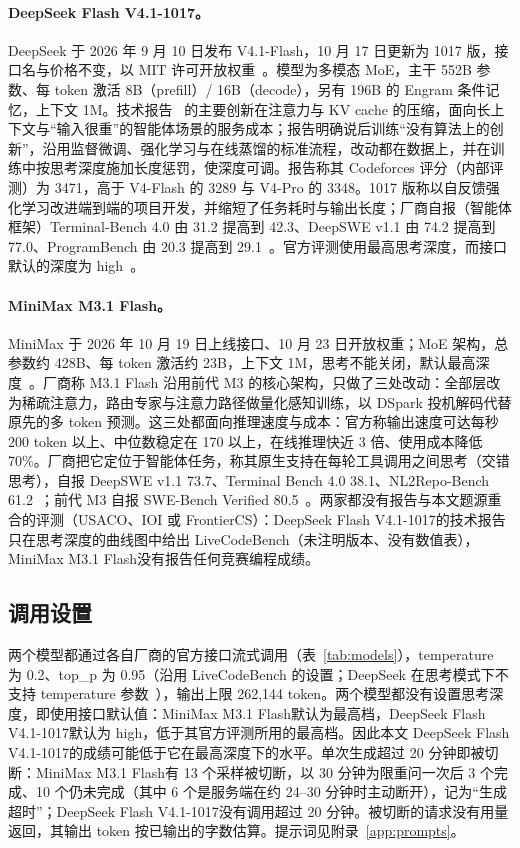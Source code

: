 \documentclass[11pt,a4paper,fontset=none]{ctexart}
\newcommand{\ds}{DeepSeek Flash V4.1-1017}
\newcommand{\mini}{MiniMax M3.1 Flash}
\begin{document}
\paragraph{\ds。}DeepSeek 于 2026 年 9 月 10 日发布 V4.1-Flash，10 月 17 日更新为 1017 版，接口名与价格不变，以 MIT 许可开放权重~\cite{ds1017}。模型为多模态 MoE，主干 552B 参数、每 token 激活 8B（prefill）/ 16B（decode），另有 196B 的 Engram 条件记忆，上下文 1M。技术报告~\cite{dsv41} 的主要创新在注意力与 KV cache 的压缩，面向长上下文与“输入很重”的智能体场景的服务成本；报告明确说后训练“没有算法上的创新”，沿用监督微调、强化学习与在线蒸馏的标准流程，改动都在数据上，并在训练中按思考深度施加长度惩罚，使深度可调。报告称其 Codeforces 评分（内部评测）为 3471，高于 V4-Flash 的 3289 与 V4-Pro 的 3348。1017 版称以自反馈强化学习改进端到端的项目开发，并缩短了任务耗时与输出长度；厂商自报（智能体框架）Terminal-Bench 4.0 由 31.2 提高到 42.3、DeepSWE v1.1 由 74.2 提高到 77.0、ProgramBench 由 20.3 提高到 29.1~\cite{ds1017}。官方评测使用最高思考深度，而接口默认的深度为 high~\cite{dsapi}。

\paragraph{\mini。}MiniMax 于 2026 年 10 月 19 日上线接口、10 月 23 日开放权重；MoE 架构，总参数约 428B、每 token 激活约 23B，上下文 1M，思考不能关闭，默认最高深度~\cite{minimaxm31}。厂商称 M3.1 Flash 沿用前代 M3 的核心架构，只做了三处改动：全部层改为稀疏注意力，路由专家与注意力路径做量化感知训练，以 DSpark 投机解码代替原先的多 token 预测。这三处都面向推理速度与成本：官方称输出速度可达每秒 200 token 以上、中位数稳定在 170 以上，在线推理快近 3 倍、使用成本降低 70\%。厂商把它定位于智能体任务，称其原生支持在每轮工具调用之间思考（交错思考），自报 DeepSWE v1.1 73.7、Terminal Bench 4.0 38.1、NL2Repo-Bench 61.2~\cite{minimaxm31}；前代 M3 自报 SWE-Bench Verified 80.5~\cite{minimaxm3}。两家都没有报告与本文题源重合的评测（USACO、IOI 或 FrontierCS）：\ds 的技术报告只在思考深度的曲线图中给出 LiveCodeBench（未注明版本、没有数值表），\mini 没有报告任何竞赛编程成绩。

\subsection{调用设置}

两个模型都通过各自厂商的官方接口流式调用（表~\ref{tab:models}），temperature 为 0.2、top\_p 为 0.95（沿用 LiveCodeBench 的设置；DeepSeek 在思考模式下不支持 temperature 参数~\cite{dsapi}），输出上限 262,144 token。两个模型都没有设置思考深度，即使用接口默认值：\mini 默认为最高档，\ds 默认为 high，低于其官方评测所用的最高档。因此本文 \ds 的成绩可能低于它在最高深度下的水平。单次生成超过 20 分钟即被切断：\mini 有 13 个采样被切断，以 30 分钟为限重问一次后 3 个完成、10 个仍未完成（其中 6 个是服务端在约 24--30 分钟时主动断开），记为“生成超时”；\ds 没有调用超过 20 分钟。被切断的请求没有用量返回，其输出 token 按已输出的字数估算。提示词见附录~\ref{app:prompts}。
\end{document}
